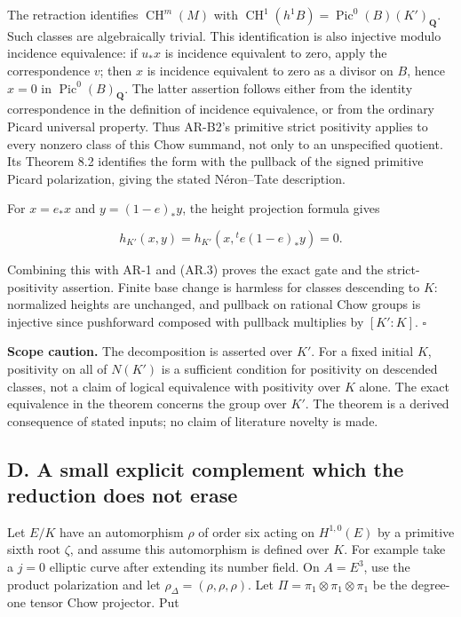 \documentclass[11pt,a4paper]{article}
\begin{document}
The retraction identifies \(\operatorname{CH}^m(M)\) with
\(\operatorname{CH}^1(h^1B)=\operatorname{Pic}^0(B)(K')_{\mathbf Q}\).
Such classes are algebraically trivial. This identification is also
injective modulo incidence equivalence: if \(u_*x\) is incidence
equivalent to zero, apply the correspondence \(v\); then \(x\) is
incidence equivalent to zero as a divisor on \(B\), hence \(x=0\) in
\(\operatorname{Pic}^0(B)_{\mathbf Q}\). The latter assertion follows
either from the identity correspondence in the definition of incidence
equivalence, or from the ordinary Picard universal property. Thus
AR-B2's primitive strict positivity applies to every nonzero class of
this Chow summand, not only to an unspecified quotient. Its Theorem 8.2
identifies the form with the pullback of the signed primitive Picard
polarization, giving the stated Néron--Tate description.

For \(x=e_*x\) and \(y=(1-e)_*y\), the height projection formula gives

\[
h_{K'}(x,y)=h_{K'}(x,{}^t e(1-e)_*y)=0.
\]

Combining this with AR-1 and (AR.3) proves the exact gate and the
strict-positivity assertion. Finite base change is harmless for classes
descending to \(K\): normalized heights are unchanged, and pullback on
rational Chow groups is injective since pushforward composed with
pullback multiplies by \([K':K]\). \(\square\)

\textbf{Scope caution.} The decomposition is asserted over \(K'\). For a
fixed initial \(K\), positivity on all of \(N(K')\) is a sufficient
condition for positivity on descended classes, not a claim of logical
equivalence with positivity over \(K\) alone. The exact equivalence in
the theorem concerns the group over \(K'\). The theorem is a derived
consequence of stated inputs; no claim of literature novelty is made.

\subsection{D. A small explicit complement which the reduction does not
erase}\label{d.-a-small-explicit-complement-which-the-reduction-does-not-erase}

Let \(E/K\) have an automorphism \(\rho\) of order six acting on
\(H^{1,0}(E)\) by a primitive sixth root \(\zeta\), and assume this
automorphism is defined over \(K\). For example take a \(j=0\) elliptic
curve after extending its number field. On \(A=E^3\), use the product
polarization and let \(\rho_\Delta=(\rho,\rho,\rho)\). Let
\(\Pi=\pi_1\otimes\pi_1\otimes\pi_1\) be the degree-one tensor Chow
projector. Put
\end{document}
